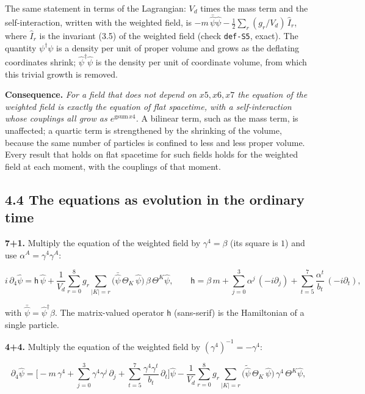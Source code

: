 \documentclass[
  10pt,
]{article}
\begin{document}
The same statement in terms of the Lagrangian: \(V_d\) times the mass
term and the self-interaction, written with the weighted field, is
\(-m\,\bar{\hat\psi}\hat\psi-\tfrac12\sum_r(g_r/V_d)\,\hat I_r\), where
\(\hat I_r\) is the invariant (3.5) of the weighted field (check
\texttt{def-S5}, exact). The quantity \(\psi^\dagger\psi\) is a density
per unit of proper volume and grows as the deflating coordinates shrink;
\(\hat\psi^\dagger\hat\psi\) is the density per unit of coordinate
volume, from which this trivial growth is removed.

\textbf{Consequence.} \emph{For a field that does not depend on
\(x5,x6,x7\) the equation of the weighted field is exactly the equation
of flat spacetime, with a self-interaction whose couplings all grow as
\(e^{\mathrm{gsum}\,x4}\).} A bilinear term, such as the mass term, is
unaffected; a quartic term is strengthened by the shrinking of the
volume, because the same number of particles is confined to less and
less proper volume. Every result that holds on flat spacetime for such
fields holds for the weighted field at each moment, with the couplings
of that moment.

\hypertarget{the-equations-as-evolution-in-the-ordinary-time}{%
\subsection{4.4 The equations as evolution in the ordinary
time}\label{the-equations-as-evolution-in-the-ordinary-time}}

\textbf{7+1.} Multiply the equation of the weighted field by
\(\gamma^4=\beta\) (its square is \(1\)) and use
\(\alpha^A=\gamma^4\gamma^A\):

\[i\,\partial_4\hat\psi=\mathsf h\,\hat\psi+\frac{1}{V_d}\sum_{r=0}^{8}g_r\sum_{|K|=r}\big(\bar{\hat\psi}\,\Theta_K\,\hat\psi\big)\,\beta\,\Theta^K\hat\psi,
\qquad
\mathsf h=\beta\,m+\sum_{j=0}^{3}\alpha^j\,(-i\partial_j)+\sum_{t=5}^{7}\frac{\alpha^t}{b_t}\,(-i\partial_t),\tag{4.7}\]

with \(\bar{\hat\psi}=\hat\psi^\dagger\beta\). The matrix-valued
operator \(\mathsf h\) (sans-serif) is the Hamiltonian of a single
particle.

\textbf{4+4.} Multiply the equation of the weighted field by
\((\gamma^4)^{-1}=-\gamma^4\):

\[\partial_4\hat\psi=\Big[-m\,\gamma^4+\sum_{j=0}^{3}\gamma^4\gamma^j\,\partial_j+\sum_{t=5}^{7}\frac{\gamma^4\gamma^t}{b_t}\,\partial_t\Big]\hat\psi
-\frac{1}{V_d}\sum_{r=0}^{8}g_r\sum_{|K|=r}\big(\tilde{\hat\psi}\,\Theta_K\,\hat\psi\big)\,\gamma^4\,\Theta^K\hat\psi,\tag{4.8}\]
\end{document}
